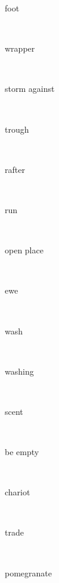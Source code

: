 \documentclass[a4paper]{article}
\begin{document}
\begin{multicols}{4}
\begin{multicols}{4}
\begin{multicols}{5}
{\hebrewfont{}} \begin{english}foot\end{english}\\
{\hebrewfont{}} \begin{english}wrapper\end{english}\\
{\hebrewfont{}} \begin{english}storm against\end{english}\\
{\hebrewfont{}} \begin{english}trough\end{english}\\
{\hebrewfont{}} \begin{english}rafter\end{english}\\
{\hebrewfont{}} \begin{english}run\end{english}\\
{\hebrewfont{}} \begin{english}open place\end{english}\\
{\hebrewfont{}} \begin{english}ewe\end{english}\\
{\hebrewfont{}} \begin{english}wash\end{english}\\
{\hebrewfont{}} \begin{english}washing\end{english}\\
{\hebrewfont{}} \begin{english}scent\end{english}\\
{\hebrewfont{}} \begin{english}be empty\end{english}\\
{\hebrewfont{}} \begin{english}chariot\end{english}\\
{\hebrewfont{}} \begin{english}trade\end{english}\\
{\hebrewfont{}} \begin{english}pomegranate\end{english}\\

\end{multicols}
\end{multicols}
\end{multicols}
\end{document}
